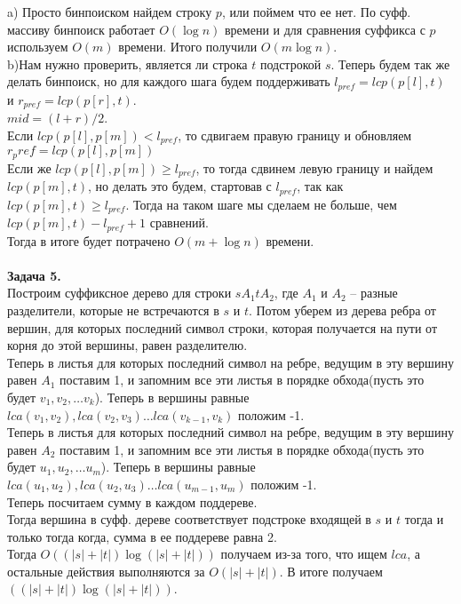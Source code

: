 \documentclass[12pt,a4paper]{scrartcl}
\begin{document}
	a) Просто бинпоиском найдем строку $p$, или поймем что ее нет. По суфф. массиву бинпоиск работает $O(\log n)$ времени и для сравнения суффикса с $p$ используем $O(m)$ времени. Итого получили $O(m\log n)$.\\
	
	b)Нам нужно проверить, является ли строка $t$ подстрокой $s$. Теперь будем так же делать бинпоиск, но для каждого шага будем поддерживать $l_{pref} = lcp(p[l], t)$ и  $r_{pref} = lcp(p[r], t)$. \\
	$mid = (l + r) / 2$. \\
	Если $lcp(p[l], p[m]) < l_{pref}$, то сдвигаем правую границу и обновляем $r_pref = lcp(p[l], p[m])$\\
	Если же $lcp(p[l], p[m]) \geq l_{pref}$, то тогда сдвинем левую границу и найдем $lcp(p[m], t)$, но делать это будем, стартовав с $l_{pref}$, так как $lcp(p[m], t) \geq l_{pref}$. Тогда на таком шаге мы сделаем не больше, чем $lcp(p[m], t) - l_{pref} + 1$ сравнений. \\
	Тогда в итоге будет потрачено $O(m + \log n)$ времени.
	\\
	\\
	\textbf{Задача 5.} \\
	
	Построим суффиксное дерево для строки $sA_1tA_2$, где $A_1$ и $A_2$ -- разные разделители, которые не встречаются в $s$ и $t$. Потом уберем из дерева ребра от вершин, для которых последний символ строки, которая получается на пути от корня до этой вершины, равен разделителю. \\
	Теперь в листья для которых последний символ на ребре, ведущим в эту вершину равен $A_1$ поставим 1, и запомним все эти листья в порядке обхода(пусть это будет $v_1, v_2, \dotso v_k$). Теперь в вершины равные $lca(v_1, v_2), lca(v_2, v_3) \dotso lca(v_{k - 1}, v_k)$ положим -1. \\
	Теперь в листья для которых последний символ на ребре, ведущим в эту вершину равен $A_2$ поставим 1, и запомним все эти листья в порядке обхода(пусть это будет $u_1, u_2, \dotso u_m$). Теперь в вершины равные $lca(u_1, u_2), lca(u_2, u_3) \dotso lca(u_{m - 1}, u_m)$ положим -1.\\
	Теперь посчитаем сумму в каждом поддереве. \\
	Тогда вершина в суфф. дереве соответствует подстроке входящей в $s$ и $t$ тогда и только тогда когда, сумма в ее поддереве равна 2. \\
	Тогда $O((|s| + |t|) \log(|s| + |t|))$  получаем из-за того, что ищем $lca$, а остальные действия выполняются за $O(|s| + |t|)$. В итоге получаем $((|s| + |t|) \log(|s| + |t|))$. \\
\end{document}

